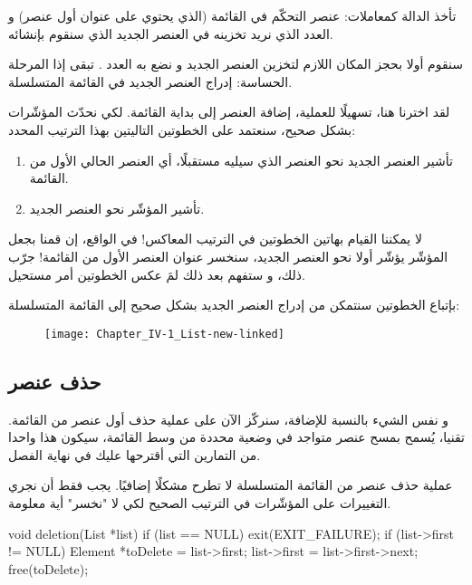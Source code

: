 تأخذ الدالة
كمعاملات: عنصر التحكّم في القائمة (الذي يحتوي على عنوان أول عنصر) و العدد الذي نريد تخزينه في العنصر الجديد الذي سنقوم بإنشائه. 

سنقوم أولا بحجز المكان اللازم لتخزين العنصر الجديد و نضع به العدد
.
تبقى إذا المرحلة الحساسة: إدراج العنصر الجديد في القائمة المتسلسلة.

لقد اخترنا هنا، تسهيلًا للعملية، إضافة العنصر إلى بداية القائمة. لكي نحدّث المؤشّرات بشكل صحيح، سنعتمد على الخطوتين التاليتين بهذا الترتيب المحدد:

\begin{enumerate}
	\item تأشير العنصر الجديد نحو العنصر الذي سيليه مستقبلًا، أي العنصر الحالي الأول من القائمة.
	\item تأشير المؤشّر
	نحو العنصر الجديد.
\end{enumerate}

\begin{warning}
لا يمكننا القيام بهاتين الخطوتين في الترتيب المعاكس! في الواقع، إن قمنا بجعل المؤشّر
يؤشّر أولا نحو العنصر الجديد، سنخسر عنوان العنصر الأول من القائمة! جرّب ذلك، و ستفهم بعد ذلك لمَ عكس الخطوتين أمر مستحيل.
\end{warning}

بإتباع الخطوتين سنتمكن من إدراج العنصر الجديد بشكل صحيح إلى القائمة المتسلسلة:

\begin{figure}[H]
	\centering
	\texttt{[image: Chapter\_IV-1\_List-new-linked]}
\end{figure}

\subsection{حذف عنصر}

و نفس الشيء بالنسبة للإضافة، سنركّز الآن على عملية حذف أول عنصر من القائمة. تقنيا، يُسمح بمسح عنصر متواجد في وضعية محددة من وسط القائمة، سيكون هذا واحدا من التمارين التي أقترحها عليك في نهاية الفصل.

عملية حذف عنصر من القائمة المتسلسلة لا تطرح مشكلًا إضافيًا. يجب فقط أن نجري التغييرات على المؤشّرات في الترتيب الصحيح لكي لا "نخسر" أية معلومة.

\begin{Csource}
void deletion(List *list)
{
	if (list == NULL)
	{
		exit(EXIT_FAILURE);
	}
	if (list->first != NULL)
	{
		Element *toDelete = list->first;
		list->first = list->first->next;
		free(toDelete);
	}
}
\end{Csource}

